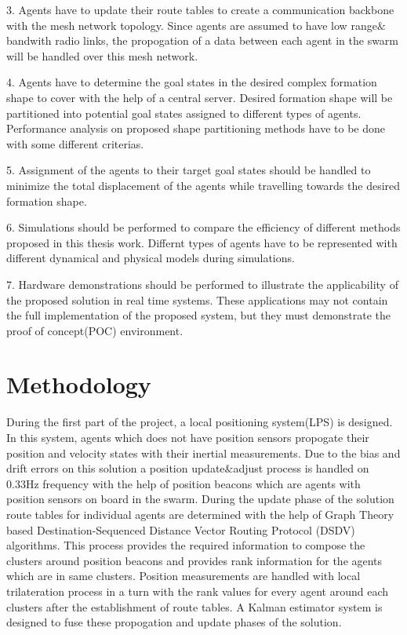 3. Agents have to update their route tables to create a communication backbone with the mesh network topology. Since agents are assumed to have low range$\&$bandwith radio links, the propogation of a data between each agent in the swarm will be handled over this mesh network. 

4. Agents have to determine the goal states in the desired complex formation shape to cover with the help of a central server. Desired formation shape will be partitioned into potential goal states assigned to different types of agents. Performance analysis on proposed shape partitioning methods have to be done with some different criterias. 

5. Assignment of the agents to their target goal states should be handled to minimize the total displacement of the agents while travelling towards the desired formation shape. 

6. Simulations should be performed to compare the efficiency of different methods proposed in this thesis work. Differnt types of agents have to be represented with different dynamical and physical models during simulations.

7. Hardware demonstrations should be performed to illustrate the applicability of the proposed solution in real time systems. These applications may not contain the full implementation of the proposed system, but they must demonstrate the proof of concept(POC) environment.

\section{Methodology}
During the first part of the project, a local positioning system(LPS) is designed. In this system, agents which does not have position sensors propogate their position and velocity states with their inertial measurements. Due to the bias and drift errors on this solution a position update$\&$adjust process is handled on 0.33Hz frequency with the help of position beacons which are agents with position sensors on board in the swarm. During the update phase of the solution route tables for individual agents are determined with the help of Graph Theory based Destination-Sequenced Distance Vector Routing Protocol (DSDV) algorithms. This process provides the required information to compose the clusters around position beacons and provides rank information for the agents which are in same clusters. Position measurements are handled with local trilateration process in a turn with the rank values for every agent around each clusters after the establishment of route tables. A Kalman estimator system is designed to fuse these propogation and update phases of the solution.

